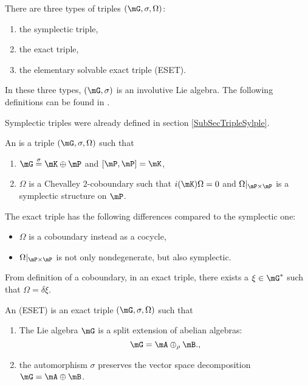 There are three types of triples $(\mG,\sigma,\Omega)$: 
\begin{enumerate}

	\item
		the symplectic triple,
	\item
		the exact triple, 
	\item
		the elementary solvable exact triple (ESET). 
\end{enumerate}
In these three types, $(\mG,\sigma)$ is an involutive Lie algebra. The following definitions can be found in \cite{StrictSolvableSym}.

Symplectic triples were already defined in section \ref{SubSecTripleSylple}.
\begin{definition}
An  is a triple $(\mG,\sigma,\Omega)$ such that
\begin{enumerate}
\item $\mG\stackrel{\sigma}{=}\mK\oplus\mP$ and $[\mP,\mP]=\mK$,
\item $\Omega$ is a Chevalley $2$-coboundary such that $i(\mK)\Omega=0$ and $\Omega|_{\mP\times\mP}$ is a symplectic structure on $\mP$.
\end{enumerate}
\end{definition}
The exact triple has the following differences compared to the symplectic one:
\begin{itemize}
\item $\Omega$ is a coboundary instead as a cocycle,
\item $\Omega|_{\mP\times\mP}$ is not only nondegenerate, but also symplectic.
\end{itemize}
From definition of a coboundary, in an exact triple, there exists a $\xi\in\mG^*$ such that $\Omega=\delta\xi$.

\begin{definition}
An  (ESET) is an exact triple $(\mG,\sigma,\Omega)$ such that
\begin{enumerate}
\item The Lie algebra $\mG$ is a split extension of abelian algebras:
\begin{equation}   \label{EqSplitmGABab}
  \mG=\mA\oplus_{\rho}\mB.,
\end{equation}
\item the automorphism $\sigma$ preserves the vector space decomposition $\mG=\mA\oplus\mB$.
\end{enumerate}

\end{definition}

